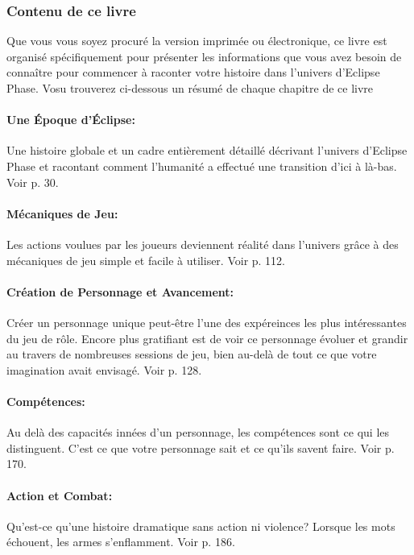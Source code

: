 \subsubsection{Contenu de ce livre} \label{sec:contents-this-book} 

Que vous vous soyez procuré la version imprimée ou électronique, ce livre est organisé spécifiquement pour présenter les informations que vous avez besoin de connaître pour commencer à raconter votre histoire dans l'univers d'Eclipse Phase. Vosu trouverez ci-dessous un résumé de chaque chapitre de ce livre 

\paragraph{Une Époque d'Éclipse:} Une histoire globale et un cadre entièrement détaillé décrivant l'univers d'Eclipse Phase et racontant comment l'humanité a effectué une transition d'ici à là-bas. Voir p. 30. 

\paragraph{Mécaniques de Jeu:} Les actions voulues par les joueurs deviennent réalité dans l'univers grâce à des mécaniques de jeu simple et facile à utiliser. Voir p. 112. 

\paragraph{Création de Personnage et Avancement:} Créer un personnage unique peut-être l'une des expéreinces les plus intéressantes du jeu de rôle. Encore plus gratifiant est de voir ce personnage évoluer et grandir au travers de nombreuses sessions de jeu, bien au-delà de tout ce que votre imagination avait envisagé. Voir p. 128. 

\paragraph{Compétences:} Au delà des capacités innées d'un personnage, les compétences sont ce qui les distinguent. C'est ce que votre personnage sait et ce qu'ils savent faire. Voir p. 170. 

\paragraph{Action et Combat:} Qu'est-ce qu'une histoire dramatique sans action ni violence? Lorsque les mots échouent, les armes s'enflamment. Voir p. 186. 

